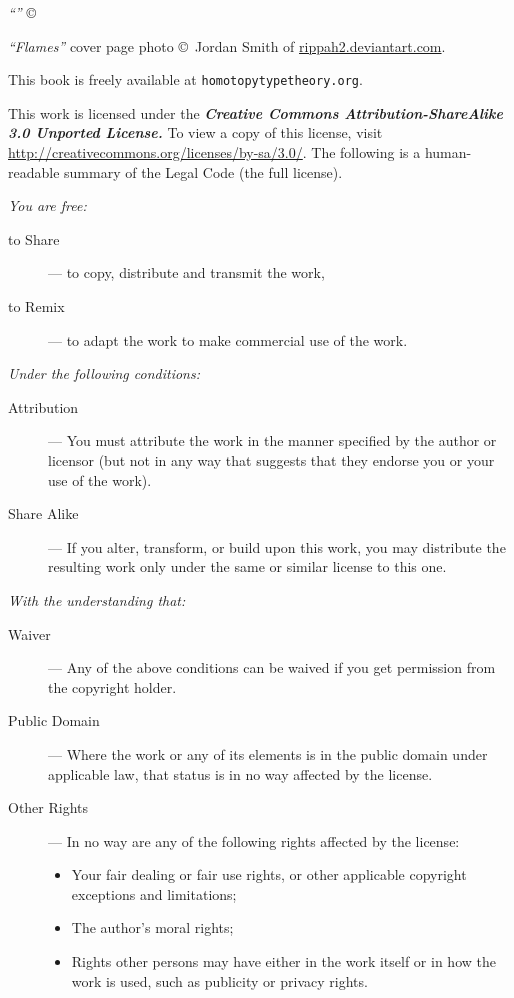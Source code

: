 {\footnotesize
\noindent
\emph{``\ourtitle''}
\copyright\ \ourauthor

\bigskip

\noindent
\emph{``Flames''} cover page photo
\copyright\ Jordan Smith of \href{http://rippah2.deviantart.com/}{rippah2.deviantart.com}.

\bigskip

\noindent
This book is freely available at
{\tt homotopytypetheory.org}.
%

\bigskip

\noindent
This work is licensed under the
\textbf{\emph{Creative Commons Attribution-ShareAlike 3.0 Unported License.}}
%
To view a copy of this license, visit
\href{http://creativecommons.org/licenses/by-sa/3.0/}{http://creativecommons.org/licenses/by-sa/3.0/}.
The following is a human-readable summary of the Legal Code (the full license).

\bigskip

\noindent
\emph{You are free:}
%
\begin{description}
\item[to Share] --- to copy, distribute and transmit the work,
\item[to Remix] --- to adapt the work to make commercial use of the work.
\end{description}
%
\emph{Under the following conditions:}
%
\begin{description}

\item[Attribution] --- You must attribute the work in the manner specified by the author
  or licensor (but not in any way that suggests that they endorse you or your use of the
  work).

\item[Share Alike] --- If you alter, transform, or build upon this work, you may
  distribute the resulting work only under the same or similar license to this one.
\end{description}
%
\emph{With the understanding that:}
\begin{description}

\item[Waiver] --- Any of the above conditions can be waived if you get permission from the
  copyright holder.

\item[Public Domain] --- Where the work or any of its elements is in the public domain
  under applicable law, that status is in no way affected by the license.

\item[Other Rights] --- In no way are any of the following rights affected by the license:
  \begin{itemize}
  \item Your fair dealing or fair use rights, or other applicable copyright exceptions and
    limitations;
  \item The author's moral rights;
  \item Rights other persons may have either in the work itself or in how the work is
    used, such as publicity or privacy rights.
  \end{itemize}
\end{description}
}
\cleardoublepage

\restoregeometry

\pagestyle{fancyplain}

